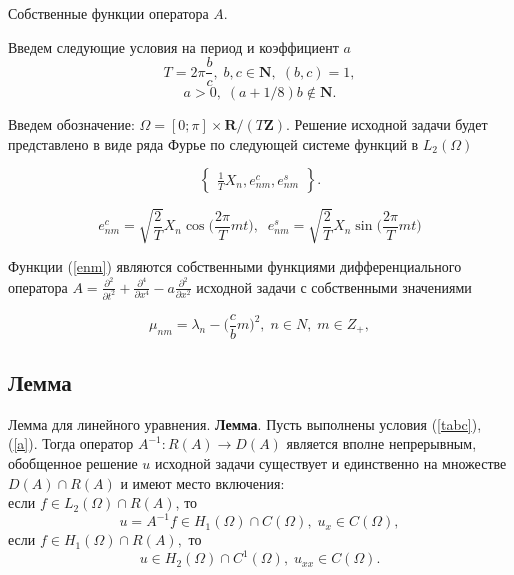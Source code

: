 \documentclass[ignorenonframetext,unicode,handout, 9pt]{beamer}
\numberwithin{equation}{section}
\begin{document}
\begin{frame}{Собственные функции оператора $A$.}

Введем следующие условия на период и коэффициент $a$
\begin{equation}\label{tabc}
  T = 2\pi\frac{b}{c},\; b,c \in \textbf{N}, \; (b,c) = 1,
\end{equation}
\begin{equation}\label{a}
  a > 0, \; (a + 1/8)b \notin \textbf{N}.
\end{equation}

Введем обозначение: $\Omega = [0;\pi] \times \textbf{R}/ (T \textbf{Z})$. Решение исходной задачи будет представлено в виде ряда Фурье по следующей системе функций в $L_2(\Omega)$

\[\left\{\begin{array}{lr}\label{fwef}\frac{1}{T} X_n,  e_{nm}^c, e_{nm}^s\end{array}\right\}.\]

\begin{equation}
  e_{nm}^c = \sqrt{\frac{2}{T}}X_n \cos\bigg(\frac{2\pi}{T}m t\bigg), \;\; e_{nm}^s = \sqrt{\frac{2}{T}}X_n \sin\bigg(\frac{2\pi}{T}m t\bigg) \label{enm}
\end{equation}

Функции (\ref{enm}) являются собственными функциями дифференциального оператора $A = \frac{\partial^2}{\partial t^2} + \frac{\partial^4}{\partial x^4} - a \frac{\partial^2}{\partial x^2}$ исходной задачи с собственными значениями

 \begin{equation}\label{munm}
   \mu_{nm} = \lambda_n - \bigg(\frac{c}{b}m\bigg)^2,\; n \in N, \; m \in Z_+,
 \end{equation}

\end{frame}


\subsection{Лемма}

\begin{frame}{Лемма для линейного уравнения.}
\textbf{Лемма}. Пусть выполнены условия (\ref{tabc}), (\ref{a}). Тогда оператор $A^{-1} : R(A) \rightarrow D(A)$ является вполне непрерывным, обобщенное решение $u$ исходной задачи существует и единственно на множестве $D(A) \cap R(A)$ и имеют место включения: \\
если $f \in L_2(\Omega)\cap R(A)$, то
\begin{equation}\label{1}
  u = A^{-1}f \in H_1(\Omega)\cap C(\Omega), \; u_x \in C(\Omega),
\end{equation}
если $f \in  H_1(\Omega) \cap  R(A), $ то
\begin{equation}\label{2}
  u \in H_2(\Omega) \cap C^1(\Omega), \; u_{xx} \in C(\Omega).
\end{equation}

\end{frame}
\end{document}
